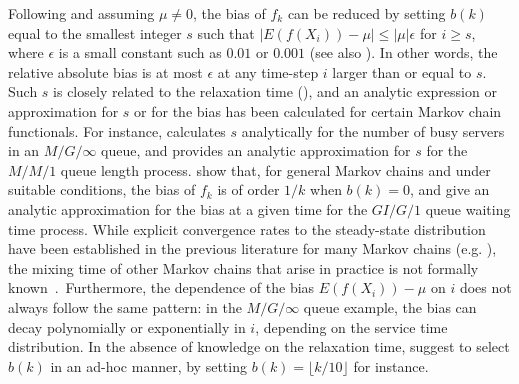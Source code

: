 \documentclass[a4paper,11pt]{article}
\begin{document}
Following 
 \citet{whitt1991longRun} and assuming \(\mu\neq0\), the bias of \(f_{k}\) can be reduced by setting \(b(k)\) equal to the smallest integer \(s\) such that \(|E(f(X_{i}))-\mu|\leq |\mu|\epsilon\) for \(i\ge s\),  where \(\epsilon\) is a small constant such as \(0.01\) or \(0.001\) (see also   \cite[p. 102]{asmussenGlynn2007}). In other words, the relative absolute bias is at most \(\epsilon\) at any time-step \(i\) larger than or equal to \(s\).  Such \(s\)  is closely related to the relaxation time (\citet[Chap. IV]{asmussenGlynn2007}), and an analytic expression or approximation for \(s\) or for the bias has been calculated  for certain Markov chain functionals. For instance,  \citet{whitt1991longRun}
 calculates \(s\) analytically  for the number of busy servers in an \(M/G/\infty\) queue, and provides an analytic approximation for \(s\) for the    \(M/M/1\) queue length process.   \citet[Chap. IV]{asmussenGlynn2007} show that, for general Markov chains and under suitable conditions, the bias of \(f_{k}\) is of order \(1/k\)  when \(b(k)=0\), and give an analytic approximation for the bias at a given time  for the \(GI/G/1\) queue waiting time process.  While explicit convergence rates  to the steady-state distribution have been established in the previous literature for many Markov chains (e.g. \cite{diaconis1991geometric,sinclair1992improved,VempalaCousins2016,kahaleGaussian2019,barkhagen2021stochastic,sinclair2022critical}), the mixing time of other Markov chains that arise in practice is not  formally known~\cite{diaconis2009markov}.\  Furthermore, the dependence  of the bias  \(E(f(X_{i}))-\mu\) on  \(i\) does not always follow the same pattern: in the  \(M/G/\infty\) queue example,    the  bias can decay polynomially or exponentially in \(i\), depending on the service time distribution. In the absence of knowledge on the relaxation time,    \citet[p. 102]{asmussenGlynn2007} suggest to select \(b(k)\) in an ad-hoc manner, by setting    \(b(k)=\lfloor k/10\rfloor\) for instance. 
\end{document}
